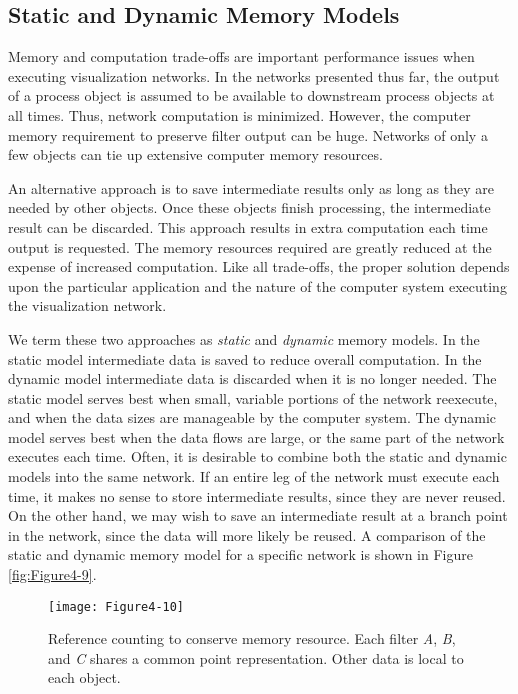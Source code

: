 \subsection{Static and Dynamic Memory Models}
\label{subsec:static_dynamic_memory_models}

Memory and computation trade-offs are important performance issues when executing visualization networks. In the networks presented thus far, the output of a process object is assumed to be available to downstream process objects at all times. Thus, network computation is minimized. However, the computer memory requirement to preserve filter output can be huge. Networks of only a few objects can tie up extensive computer memory resources.

An alternative approach is to save intermediate results only as long as they are needed by other objects. Once these objects finish processing, the intermediate result can be discarded. This approach results in extra computation each time output is requested. The memory resources required are greatly reduced at the expense of increased computation. Like all trade-offs, the proper solution depends upon the particular application and the nature of the computer system executing the visualization network.

We term these two approaches as \emph{static} and \emph{dynamic} memory models. In the static model intermediate data is saved to reduce overall computation. In the dynamic model intermediate data is discarded when it is no longer needed. The static model serves best when small, variable portions of the network reexecute, and when the data sizes are manageable by the computer system. The dynamic model serves best when the data flows are large, or the same part of the network executes each time. Often, it is desirable to combine both the static and dynamic models into the same network. If an entire leg of the network must execute each time, it makes no sense to store intermediate results, since they are never reused. On the other hand, we may wish to save an intermediate result at a branch point in the network, since the data will more likely be reused. A comparison of the static and dynamic memory model for a specific network is shown in Figure \ref{fig:Figure4-9}.

\begin{figure}[!htb]
  \centering
  \texttt{[image: Figure4-10]}\\
  \caption{Reference counting to conserve memory resource. Each filter \emph{A}, \emph{B}, and \emph{C} shares a common point representation. Other data is local to each object.}\label{fig:Figure4-10}
\end{figure}


